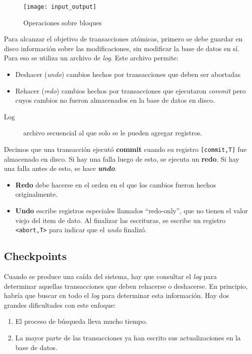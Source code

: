 \documentclass[a4paper, twoside]{article}
\begin{document}
\begin{figure}[H]
	\centering
	\texttt{[image: input\_output]}
	\caption{Operaciones sobre bloques}
\end{figure}

Para alcanzar el objetivo de transacciones atómicas, primero se debe guardar en disco información sobre las modificaciones, sin modificar la base de datos en sí. Para eso se utiliza un archivo de \emph{log}. Este archivo permite: 
\begin{itemize}
	\item Deshacer (\emph{undo}) cambios hechos por transacciones que deben ser abortadas
	\item Rehacer (\emph{redo}) cambios hechos por transacciones que ejecutaron
	\emph{commit} pero cuyos cambios no fueron almacenados en la base de datos en disco.
\end{itemize}

\begin{description}
	\item[Log] archivo secuencial al que solo se le pueden agregar registros.
\end{description}

Decimos que una transacción ejecutó \textbf{commit} cuando su registro \texttt{[commit,T]} fue almacenado en disco. Si hay una falla luego de esto, se ejecuta un \textbf{redo}. Si hay una falla antes de esto, se hace \textbf{\emph{undo}}.
\begin{itemize}
	\item \textbf{Redo} debe hacerse en el orden en el que los cambios fueron hechos originalmente.
	\item \textbf{Undo} escribe registros especiales llamados ``redo-only'', que no tienen el valor viejo del item de dato. Al finalizar las escrituras, se escribe un registro \texttt{<abort,T>} para indicar que el \emph{undo} finalizó.
\end{itemize}

\subsection{Checkpoints}
Cuando se produce una caída del sistema, hay que consultar el \emph{log} para determinar aquellas transacciones que deben rehacerse o deshacerse. En principio, habría que buscar en todo el \emph{log} para determinar esta información. Hay dos grandes dificultades con este enfoque: 
\begin{enumerate}
	\item El proceso de búsqueda lleva mucho tiempo. 
	\item La mayor parte de las transacciones ya han escrito sus actualizaciones en la base de datos. 
\end{enumerate}
\end{document}
